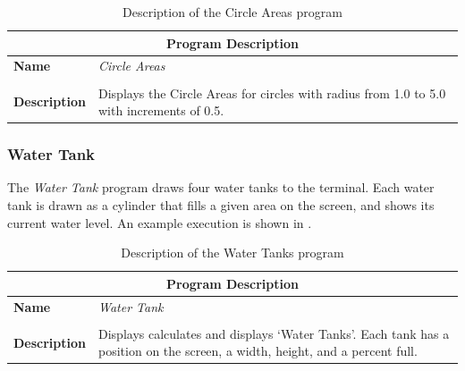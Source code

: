 \begin{table}[h]
\centering
\begin{tabular}{l|p{10cm}}
  \hline
  \multicolumn{2}{c}{\textbf{Program Description}} \\
  \hline
  \textbf{Name} & \emph{Circle Areas} \\
  \\
  \textbf{Description} & Displays the Circle Areas for circles with radius from 1.0 to 5.0 with increments of 0.5. \\
  \hline
\end{tabular}
\caption{Description of the Circle Areas program}
\label{tbl:data-circle-area}
\end{table}




\clearpage



\clearpage
\subsubsection{Water Tank} %
\label{ssub:water_tank}

The \emph{Water Tank} program draws four water tanks to the terminal. Each water tank is drawn as a cylinder that fills a given area on the screen, and shows its current water level. An example execution is shown in .

\begin{table}[h]
\centering
\begin{tabular}{l|p{10cm}}
  \hline
  \multicolumn{2}{c}{\textbf{Program Description}} \\
  \hline
  \textbf{Name} & \emph{Water Tank} \\
  \\
  \textbf{Description} & Displays calculates and displays `Water Tanks'. Each tank has a position on the screen, a width, height, and a percent full.\\
  \hline
\end{tabular}
\caption{Description of the Water Tanks program}
\label{tbl:data-water-tanks}
\end{table}

